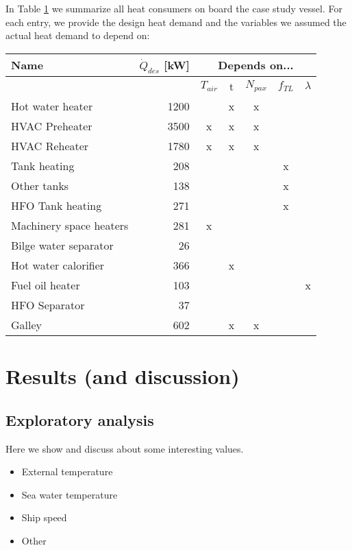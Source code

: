 \documentclass[preprint,12pt]{elsarticle}
\begin{document}
In Table \ref{tab:heatConsumers} we summarize all heat consumers on board the case study vessel. For each entry, we provide the design heat demand and the variables we assumed the actual heat demand to depend on:
\begin{table}
	\begin{tabular}{lrccccc}
		\hline 
		Name & $\dot{Q}_{des}$ [kW] & \multicolumn{5}{c}{Depends on...} \\ 
		\hline 
		 & & $T_{air}$ & t & $N_{pax}$ & $f_{TL}$ & $\lambda$ \\ 
		\hline 
		Hot water heater & 1200 &  & x & x &  &  \\ 
		HVAC Preheater & 3500 & x & x & x &  &  \\ 
		HVAC Reheater & 1780 & x & x & x &  &  \\ 
		Tank heating & 208 &  &  &  & x &  \\ 
		Other tanks & 138 &  &  &  & x &  \\ 
		HFO Tank heating & 271 &  &  &  & x &  \\ 
		Machinery space heaters & 281 & x &  &  &  &  \\ 
		Bilge water separator & 26 &  &  &  &  &  \\ 
		Hot water calorifier & 366 &  & x &  &  &  \\ 
		Fuel oil heater & 103 &  &  &  &  & x \\ 
		HFO Separator & 37 &  &  &  &  &  \\ 
		Galley & 602 &  & x & x &  &  \\
		\hline 
	\end{tabular} \label{tab:heatConsumers}
\end{table}



\section{Results (and discussion)}

\subsection{Exploratory analysis} \label{sec:res:exploratory}

Here we show and discuss about some interesting values. 
\begin{itemize}
	\item External temperature
	\item Sea water temperature
	\item Ship speed
	\item Other
\end{itemize}
\end{document}
